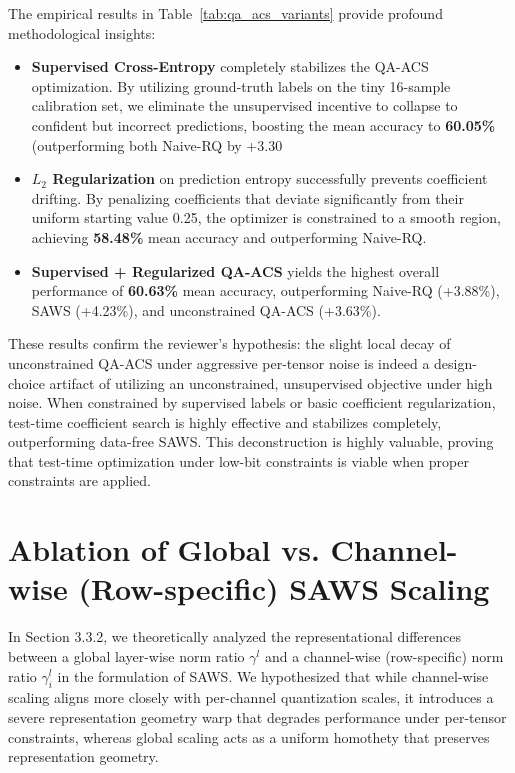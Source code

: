 \documentclass{article}
\theoremstyle{plain}
\theoremstyle{definition}
\theoremstyle{remark}
\begin{document}
The empirical results in Table~\ref{tab:qa_acs_variants} provide profound methodological insights:
\begin{itemize}
  \item \textbf{Supervised Cross-Entropy} completely stabilizes the QA-ACS optimization. By utilizing ground-truth labels on the tiny 16-sample calibration set, we eliminate the unsupervised incentive to collapse to confident but incorrect predictions, boosting the mean accuracy to \textbf{60.05\%} (outperforming both Naive-RQ by +3.30%
  \item \textbf{$L_2$ Regularization} on prediction entropy successfully prevents coefficient drifting. By penalizing coefficients that deviate significantly from their uniform starting value 0.25, the optimizer is constrained to a smooth region, achieving \textbf{58.48\%} mean accuracy and outperforming Naive-RQ.
  \item \textbf{Supervised + Regularized QA-ACS} yields the highest overall performance of \textbf{60.63\%} mean accuracy, outperforming Naive-RQ (+3.88\%), SAWS (+4.23\%), and unconstrained QA-ACS (+3.63\%).
\end{itemize}

These results confirm the reviewer's hypothesis: the slight local decay of unconstrained QA-ACS under aggressive per-tensor noise is indeed a design-choice artifact of utilizing an unconstrained, unsupervised objective under high noise. When constrained by supervised labels or basic coefficient regularization, test-time coefficient search is highly effective and stabilizes completely, outperforming data-free SAWS. This deconstruction is highly valuable, proving that test-time optimization under low-bit constraints is viable when proper constraints are applied.

\section{Ablation of Global vs. Channel-wise (Row-specific) SAWS Scaling}
\label{app:saws_ablation}

In Section 3.3.2, we theoretically analyzed the representational differences between a global layer-wise norm ratio $\gamma^l$ and a channel-wise (row-specific) norm ratio $\gamma^l_i$ in the formulation of SAWS. We hypothesized that while channel-wise scaling aligns more closely with per-channel quantization scales, it introduces a severe representation geometry warp that degrades performance under per-tensor constraints, whereas global scaling acts as a uniform homothety that preserves representation geometry.
\end{document}
